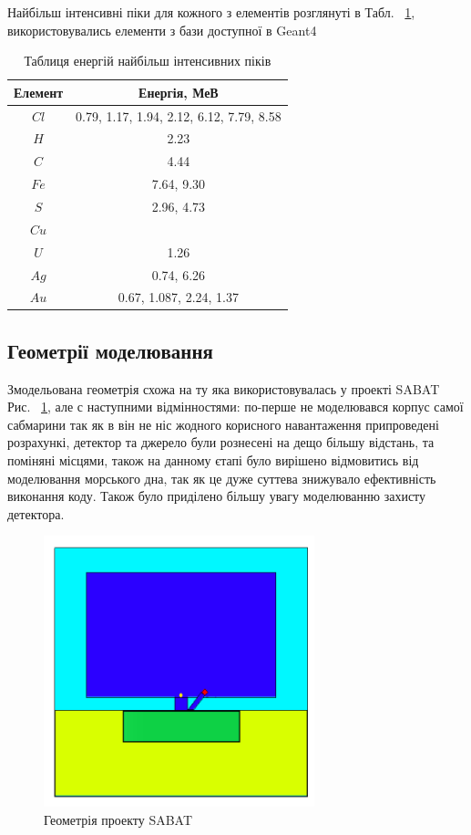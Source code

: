 \documentclass[a4paper, 14pt]{article}
\numberwithin{equation}{section}
\numberwithin{table}{section}
\begin{document}
Найбільш інтенсивні піки для кожного з елементів розглянуті в Табл. ~\ref{tabl:ElementsEnergy}, використовувались елементи з бази доступної в Geant4
\begin{table}[h]
\centering
	\begin{tabular}{|c|c|} 
		\hline
		Елемент& Енергія, МеВ \\
		\hline
		$Cl$ & 0.79, 1.17, 1.94, 2.12, 6.12, 7.79, 8.58 \\
		\hline
		$H$ & 2.23 \\
		\hline
		$C$ & 4.44 \\
		\hline
		$Fe$ & 7.64, 9.30 \\		
		\hline
		$S$ & 2.96, 4.73 \\
		\hline
		$Cu$ &  \\
		\hline
		$U$ & 1.26\\
		\hline
		$Ag$ &  0.74, 6.26 \\
		\hline
		$Au$ & 0.67, 1.087, 2.24, 1.37  \\
		
		\hline
	\end{tabular}
\caption{Таблиця енергій найбільш інтенсивних піків} 
\label{tabl:ElementsEnergy}
\end{table}

\subsection {Геометрії моделювання}
Змодельована геометрія схожа на ту яка використовувалась у проекті SABAT Рис. ~\ref{ris:SabatG}, але с наступними відмінностями: по-перше не моделювався корпус самої сабмарини так як в він не ніс жодного корисного навантаження припроведені розрахункі, детектор та джерело були рознесені на дещо більшу відстань, та поміняні місцями, також на данному єтапі було вирішено відмовитись від моделювання морського дна, так як це дуже суттева знижувало ефективність виконання коду. Також було приділено більшу увагу моделюванню захисту детектора.
\begin{figure}[hbt!]
	\centering \includegraphics[width=0.7\textwidth]{images/sabatGeometry.png}
	\caption{Геометрія проекту SABAT} 
	\label{ris:SabatG}	
\end{figure}
\end{document}
